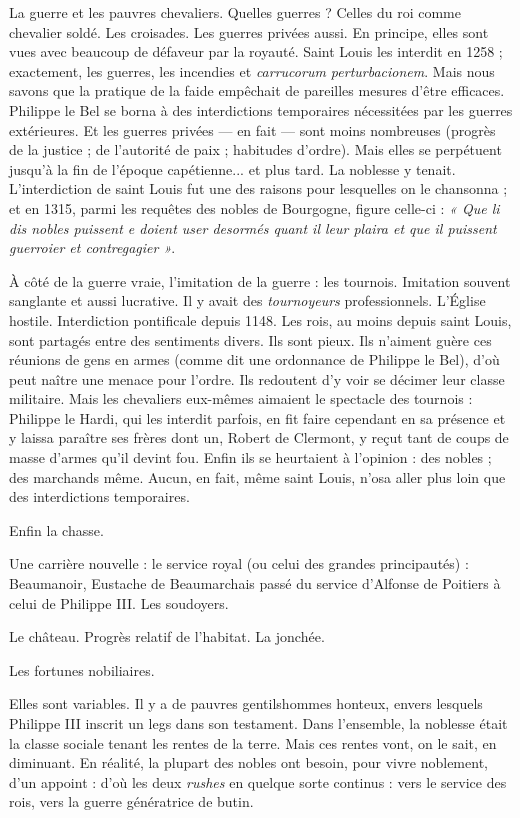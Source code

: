 \documentclass[french,twoside]{book} %
\newcommand{\labelchar}[1]{{\color{rubric}\bf #1}}
\newcommand\chapterclose{} %
\renewcommand\chapterclose{} %
\begin{document}
\noindent La guerre et les pauvres chevaliers. Quelles guerres ? Celles du roi comme chevalier soldé. Les croisades. Les guerres privées aussi. En principe, elles sont vues avec beaucoup de défaveur par la royauté. Saint Louis les interdit en 1258 ; exactement, les guerres, les incendies et \emph{carrucorum perturbacionem}. Mais nous savons que la pratique de la faide empêchait de pareilles mesures d’être efficaces. Philippe le Bel se borna à des interdictions temporaires nécessitées par les guerres extérieures. Et les guerres privées — en fait — sont moins nombreuses (progrès de la justice ; de l’autorité de paix ; habitudes d’ordre). Mais elles se perpétuent jusqu’à la fin de l’époque capétienne... et plus tard. La noblesse y tenait. L’interdiction de saint Louis fut une des raisons pour lesquelles on le chansonna ; et en 1315, parmi les requêtes des nobles de Bourgogne, figure celle-ci : \emph{« Que li dis nobles puissent e doient user desormés quant il leur plaira et que il puissent guerroier et contregagier »}.\par
À côté de la guerre vraie, l’imitation de la guerre : les tournois. Imitation souvent sanglante et aussi lucrative. Il y avait des \emph{tournoyeurs} professionnels. L’Église hostile. Interdiction pontificale depuis 1148. Les rois, au moins depuis saint Louis, sont partagés entre des sentiments divers. Ils sont pieux. Ils n’aiment guère ces réunions de gens en armes (comme dit une ordonnance de Philippe le Bel), d’où peut naître une menace pour l’ordre. Ils redoutent d’y voir se décimer leur classe militaire. Mais les chevaliers eux-mêmes aimaient le spectacle des tournois : Philippe le Hardi, qui les interdit parfois, en fit faire cependant en sa présence et y laissa paraître ses frères dont un, Robert de Clermont, y reçut tant de coups de masse d’armes qu’il devint fou. Enfin ils se heurtaient à l’opinion : des nobles ; des marchands même. Aucun, en fait, même saint Louis, n’osa aller plus loin que des interdictions temporaires.\par
Enfin la chasse.\par
Une carrière nouvelle : le service royal (ou celui des grandes principautés) : Beaumanoir, Eustache de Beaumarchais passé du service d’Alfonse de Poitiers à celui de Philippe III. Les soudoyers.\par
Le château. Progrès relatif de l’habitat. La jonchée.\par
\bigbreak
\noindent \labelchar{d)} Les fortunes nobiliaires.\par
Elles sont variables. Il y a de pauvres gentilshommes honteux, envers lesquels Philippe III inscrit un legs dans son testament. Dans l’ensemble, la noblesse était la classe sociale tenant les rentes de la terre. Mais ces rentes vont, on le sait, en diminuant. En réalité, la plupart des nobles ont besoin, pour vivre noblement, d’un appoint : d’où les deux {\itshape rushes} en quelque sorte continus : vers le service des rois, vers la guerre génératrice de butin.
\chapterclose
\end{document}
